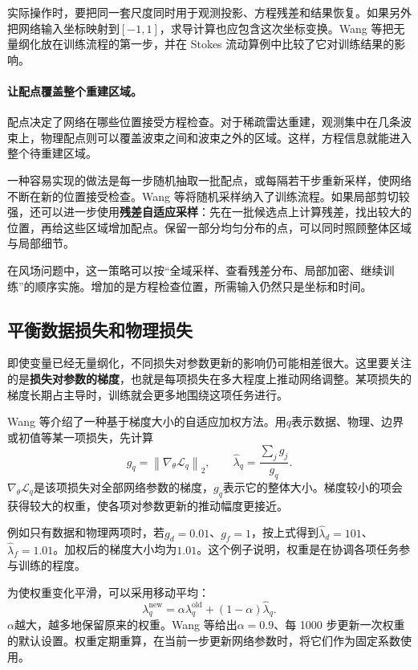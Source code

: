 实际操作时，要把同一套尺度同时用于观测投影、方程残差和结果恢复。如果另外把网络输入坐标映射到$[-1,1]$，求导计算也应包含这次坐标变换。Wang 等把无量纲化放在训练流程的第一步，并在 Stokes 流动算例中比较了它对训练结果的影响\cite{wang2023expert}。

\paragraph{让配点覆盖整个重建区域。}
配点决定了网络在哪些位置接受方程检查。对于稀疏雷达重建，观测集中在几条波束上，物理配点则可以覆盖波束之间和波束之外的区域。这样，方程信息就能进入整个待重建区域。

一种容易实现的做法是每一步随机抽取一批配点，或每隔若干步重新采样，使网络不断在新的位置接受检查。Wang 等将随机采样纳入了训练流程\cite{wang2023expert}。如果局部剪切较强，还可以进一步使用\textbf{残差自适应采样}：先在一批候选点上计算残差，找出较大的位置，再给这些区域增加配点。保留一部分均匀分布的点，可以同时照顾整体区域与局部细节。

在风场问题中，这一策略可以按“全域采样、查看残差分布、局部加密、继续训练”的顺序实施。增加的是方程检查位置，所需输入仍然只是坐标和时间。

\subsection{平衡数据损失和物理损失}
即使变量已经无量纲化，不同损失对参数更新的影响仍可能相差很大。这里要关注的是\textbf{损失对参数的梯度}，也就是每项损失在多大程度上推动网络调整。某项损失的梯度长期占主导时，训练就会更多地围绕这项任务进行。

Wang 等介绍了一种基于梯度大小的自适应加权方法\cite{wang2023expert}。用$q$表示数据、物理、边界或初值等某一项损失，先计算
\begin{equation}
 g_q=\left\|\nabla_\theta\mathcal L_q\right\|_2,\qquad
 \widehat\lambda_q=\frac{\sum_j g_j}{g_q}.
 \label{eq:pinn-gradient-balance}
\end{equation}
$\nabla_\theta\mathcal L_q$是该项损失对全部网络参数的梯度，$g_q$表示它的整体大小。梯度较小的项会获得较大的权重，使各项对参数更新的推动幅度更接近。

例如只有数据和物理两项时，若$g_d=0.01$、$g_f=1$，按上式得到$\widehat\lambda_d=101$、$\widehat\lambda_f=1.01$。加权后的梯度大小均为$1.01$。这个例子说明，权重是在协调各项任务参与训练的程度。

为使权重变化平滑，可以采用移动平均：
\begin{equation}
 \lambda_q^{\mathrm{new}}
 =\alpha\lambda_q^{\mathrm{old}}+(1-\alpha)\widehat\lambda_q.
 \label{eq:pinn-gradient-balance-ema}
\end{equation}
$\alpha$越大，越多地保留原来的权重。Wang 等给出$\alpha=0.9$、每 1000 步更新一次权重的默认设置\cite{wang2023expert}。权重定期重算，在当前一步更新网络参数时，将它们作为固定系数使用。

